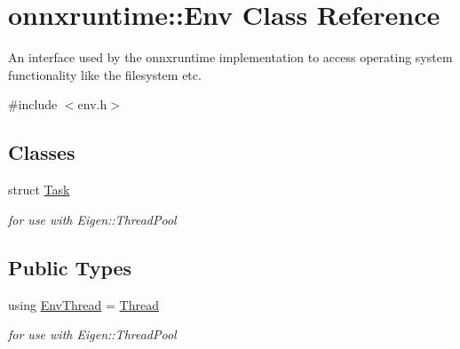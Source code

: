 \hypertarget{classonnxruntime_1_1Env}{}\section{onnxruntime\+:\+:Env Class Reference}
\label{classonnxruntime_1_1Env}


An interface used by the onnxruntime implementation to access operating system functionality like the filesystem etc.  




{\ttfamily \#include $<$env.\+h$>$}

\subsection*{Classes}
\begin{DoxyCompactItemize}
\item 
struct \mbox{\hyperlink{structonnxruntime_1_1Env_1_1Task}{Task}}
\begin{DoxyCompactList}\small\item\em for use with Eigen\+::\+Thread\+Pool \end{DoxyCompactList}\end{DoxyCompactItemize}
\subsection*{Public Types}
\begin{DoxyCompactItemize}
\item 
using \mbox{\hyperlink{classonnxruntime_1_1Env_a6bb161baf73e98f7fd274db84e3fb489}{Env\+Thread}} = \mbox{\hyperlink{classonnxruntime_1_1Thread}{Thread}}
\begin{DoxyCompactList}\small\item\em for use with Eigen\+::\+Thread\+Pool \end{DoxyCompactList}\end{DoxyCompactItemize}
